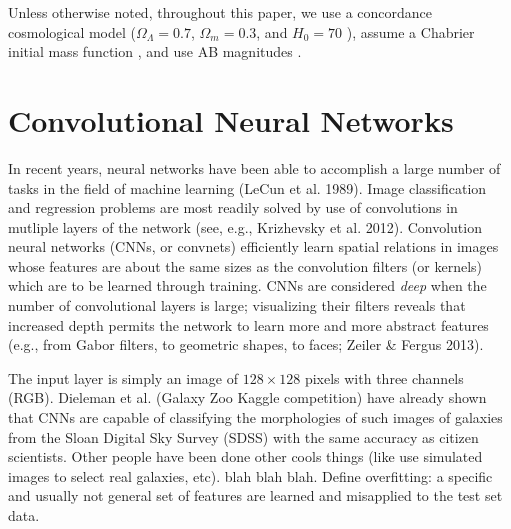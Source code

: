 \documentclass[fleqn,usenatbib]{mnras}
\begin{document}
Unless otherwise noted, throughout this paper, we use a concordance cosmological model ($\Omega_\Lambda = 0.7$, $\Omega_m = 0.3$, and $H_0= 70$ \kms \mpc), assume a Chabrier initial mass function \citep{Chabrier2003}, and use AB magnitudes \citep{Oke1974}.

\section{Convolutional Neural Networks}\label{sec:CNN}
In recent years, neural networks have been able to accomplish a large number of tasks in the field of machine learning (LeCun et al. 1989).
Image classification and regression problems are most readily solved by use of convolutions in mutliple layers of the network (see, e.g., Krizhevsky et al. 2012).
Convolution neural networks (CNNs, or convnets) efficiently learn spatial relations in images whose features are about the same sizes as the convolution filters (or kernels) which are to be learned through training.
CNNs are considered \textit{deep} when the number of convolutional layers is large; visualizing their filters reveals that increased depth permits the network to learn more and more abstract features (e.g., from Gabor filters, to geometric shapes, to faces; Zeiler \& Fergus 2013).

The input layer is simply an image of $128\times 128$ pixels with three channels (RGB).
Dieleman et al. (Galaxy Zoo Kaggle competition) have already shown that CNNs are capable of classifying the morphologies of such images of galaxies from the Sloan Digital Sky Survey (SDSS) with the same accuracy as citizen scientists.
Other people have been done other cools things (like use simulated images to select real galaxies, etc).
blah blah blah.
Define overfitting: a specific and usually not general set of features are learned and misapplied to the test set data.
\end{document}

